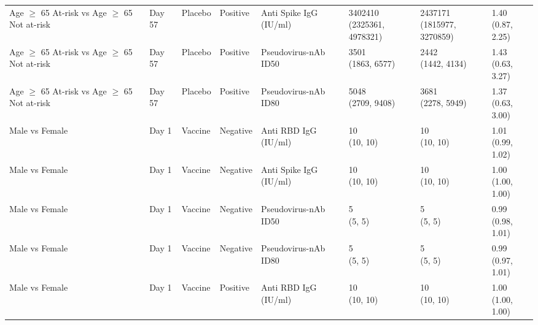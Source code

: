 \documentclass[]{book}
\theoremstyle{definition}
\theoremstyle{definition}
\theoremstyle{definition}
\newcommand{\1}{\mathbbm{1}}
\begin{document}
\begin{landscape}
\begin{ThreePartTable}
\begin{longtable}[t]{>{\raggedright\arraybackslash}p{2.7cm}lllllll}
Age $\geq$ 65 At-risk vs Age $\geq$ 65 Not at-risk & Day 57 & Placebo & Positive & Anti Spike IgG (IU/ml) & \makecell[l]{3402410\\(2325361, 4978321)} & \makecell[l]{2437171\\(1815977, 3270859)} & \makecell[l]{1.40\\(0.87, 2.25)}\\
\addlinespace
Age $\geq$ 65 At-risk vs Age $\geq$ 65 Not at-risk & Day 57 & Placebo & Positive & Pseudovirus-nAb ID50 & \makecell[l]{3501\\(1863, 6577)} & \makecell[l]{2442\\(1442, 4134)} & \makecell[l]{1.43\\(0.63, 3.27)}\\
Age $\geq$ 65 At-risk vs Age $\geq$ 65 Not at-risk & Day 57 & Placebo & Positive & Pseudovirus-nAb ID80 & \makecell[l]{5048\\(2709, 9408)} & \makecell[l]{3681\\(2278, 5949)} & \makecell[l]{1.37\\(0.63, 3.00)}\\
Male vs Female & Day 1 & Vaccine & Negative & Anti RBD IgG (IU/ml) & \makecell[l]{10\\(10, 10)} & \makecell[l]{10\\(10, 10)} & \makecell[l]{1.01\\(0.99, 1.02)}\\
Male vs Female & Day 1 & Vaccine & Negative & Anti Spike IgG (IU/ml) & \makecell[l]{10\\(10, 10)} & \makecell[l]{10\\(10, 10)} & \makecell[l]{1.00\\(1.00, 1.00)}\\
Male vs Female & Day 1 & Vaccine & Negative & Pseudovirus-nAb ID50 & \makecell[l]{5\\(5, 5)} & \makecell[l]{5\\(5, 5)} & \makecell[l]{0.99\\(0.98, 1.01)}\\
\addlinespace
Male vs Female & Day 1 & Vaccine & Negative & Pseudovirus-nAb ID80 & \makecell[l]{5\\(5, 5)} & \makecell[l]{5\\(5, 5)} & \makecell[l]{0.99\\(0.97, 1.01)}\\
Male vs Female & Day 1 & Vaccine & Positive & Anti RBD IgG (IU/ml) & \makecell[l]{10\\(10, 10)} & \makecell[l]{10\\(10, 10)} & \makecell[l]{1.00\\(1.00, 1.00)}\\

\end{longtable}
\end{ThreePartTable}
\end{landscape}
\end{document}
